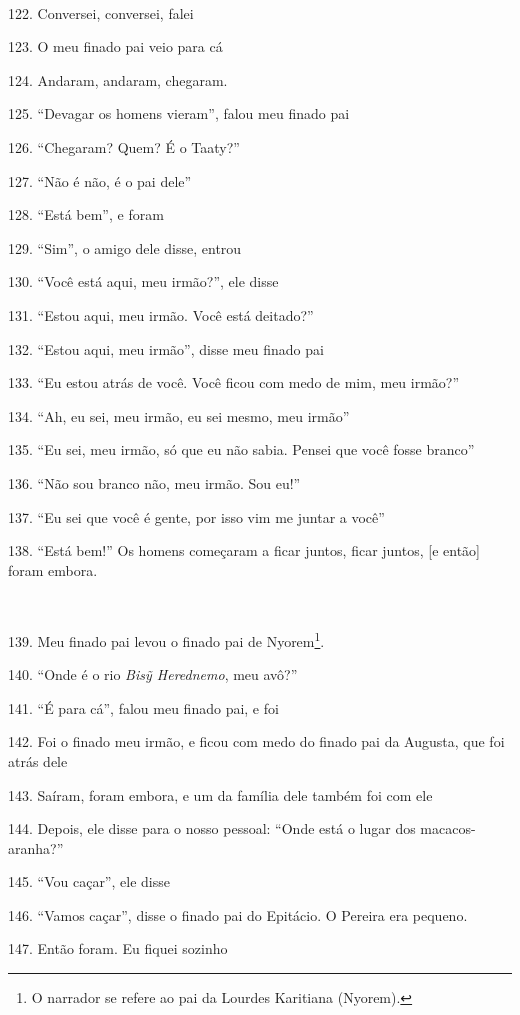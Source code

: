 ~

122. Conversei, conversei, falei

123. O meu finado pai veio para cá

124. Andaram, andaram, chegaram.

125. ``Devagar os homens vieram'', falou meu finado pai

126. ``Chegaram? Quem? É o Taaty?''

127. ``Não é não, é o pai dele''

128. ``Está bem'', e foram

129. ``Sim'', o amigo dele disse, entrou

130. ``Você está aqui, meu irmão?'', ele disse

131. ``Estou aqui, meu irmão. Você está deitado?''

132. ``Estou aqui, meu irmão'', disse meu finado pai

133. ``Eu estou atrás de você. Você ficou com medo de mim, meu irmão?''

134. ``Ah, eu sei, meu irmão, eu sei mesmo, meu irmão''

135. ``Eu sei, meu irmão, só que eu não sabia. Pensei que você fosse branco''

136. ``Não sou branco não, meu irmão. Sou eu!''

137. ``Eu sei que você é gente, por isso vim me juntar a você''

138. ``Está bem!'' Os homens começaram a ficar juntos, ficar juntos, {[}e então{]} foram embora.

~

139. Meu finado pai levou o finado pai de Nyorem\footnote{O narrador se
  refere ao pai da Lourdes Karitiana (Nyorem).}.

140. ``Onde é o rio \emph{Bisỹ Herednemo}, meu avô?''

141. ``É para cá'', falou meu finado pai, e foi

142. Foi o finado meu irmão, e ficou com medo do finado pai da Augusta,
que foi atrás dele

143. Saíram, foram embora, e um da família dele também foi com ele

144. Depois, ele disse para o nosso pessoal: ``Onde está o lugar dos
macacos- aranha?''

145. ``Vou caçar'', ele disse

146. ``Vamos caçar'', disse o finado pai do Epitácio. O Pereira era pequeno.

147. Então foram. Eu fiquei sozinho

